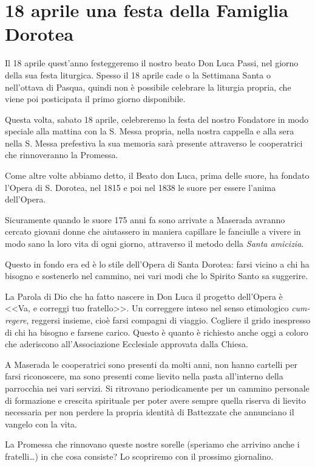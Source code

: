 \section{18 aprile una festa della Famiglia Dorotea}

Il 18 aprile quest'anno festeggeremo il nostro beato Don Luca Passi, nel giorno della sua festa liturgica. Spesso il 18 aprile cade o la Settimana Santa o nell'ottava di Pasqua, quindi non è possibile celebrare la liturgia propria, che viene poi posticipata il primo giorno disponibile.

Questa volta, sabato 18 aprile, celebreremo la festa del nostro Fondatore in modo speciale alla mattina con la S. Messa propria, nella nostra cappella e alla sera nella S. Messa prefestiva la sua memoria sarà presente attraverso le cooperatrici che rinnoveranno la Promessa.

Come altre volte abbiamo detto, il Beato don Luca, prima delle suore, ha fondato l'Opera di S. Dorotea, nel 1815 e poi nel 1838 le suore per essere l'anima dell'Opera.

Sicuramente quando le suore 175 anni fa sono arrivate a Maserada avranno cercato giovani donne che aiutassero in maniera capillare le fanciulle a vivere in modo sano la loro vita di ogni giorno, attraverso il metodo della \textit{Santa amicizia}.

Questo in fondo era ed è lo stile dell'Opera di Santa Dorotea: farsi vicino a chi ha bisogno e sostenerlo nel cammino, nei vari modi che lo Spirito Santo sa suggerire.

La Parola di Dio che ha fatto nascere in Don Luca il progetto dell'Opera è <<Va, e correggi tuo fratello>>. Un correggere inteso nel senso etimologico \textit{cum-regere}, reggersi insieme, cioè farsi compagni di viaggio. Cogliere il grido inespresso di chi ha bisogno e farsene carico. Questo è quanto è richiesto anche oggi a coloro che aderiscono all'Associazione Ecclesiale approvata dalla Chiesa.

A Maserada le cooperatrici sono presenti da molti anni, non hanno cartelli per farsi riconoscere, ma sono presenti come lievito nella pasta all'interno della parrocchia nei vari servizi. Si ritrovano periodicamente per un cammino personale di formazione e crescita spirituale per poter avere sempre quella riserva di lievito necessaria per non perdere la propria identità di Battezzate che annunciano il vangelo con la vita.

La Promessa che rinnovano queste nostre sorelle (speriamo che arrivino anche i fratelli\ldots) in che cosa consiste? Lo scopriremo con il prossimo giornalino.

